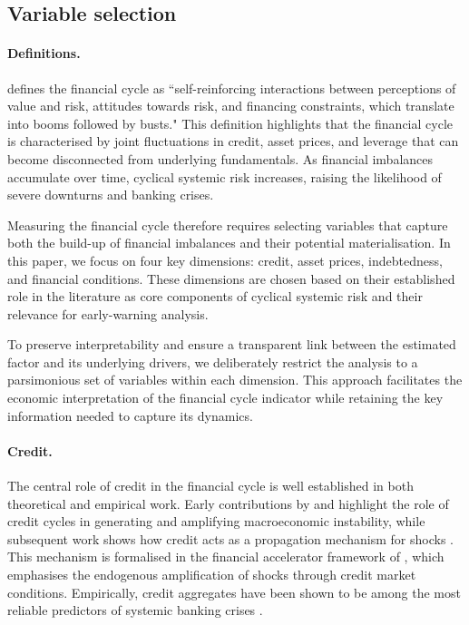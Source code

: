 \subsection{Variable selection}

\paragraph{Definitions.} 
\citet{borio2014financial} defines the financial cycle as ``self-reinforcing interactions between perceptions of value and risk, attitudes towards risk, and financing constraints, which translate into booms followed by busts." This definition highlights that the financial cycle is characterised by joint fluctuations in credit, asset prices, and leverage that can become disconnected from underlying fundamentals. As financial imbalances accumulate over time, cyclical systemic risk increases, raising the likelihood of severe downturns and banking crises.

Measuring the financial cycle therefore requires selecting variables that capture both the build-up of financial imbalances and their potential materialisation. In this paper, we focus on four key dimensions: credit, asset prices, indebtedness, and financial conditions. These dimensions are chosen based on their established role in the literature as core components of cyclical systemic risk and their relevance for early-warning analysis.

To preserve interpretability and ensure a transparent link between the estimated factor and its underlying drivers, we deliberately restrict the analysis to a parsimonious set of variables within each dimension. This approach facilitates the economic interpretation of the financial cycle indicator while retaining the key information needed to capture its dynamics.

\paragraph{Credit.}  

The central role of credit in the financial cycle is well established in both theoretical and empirical work. Early contributions by \citet{fisher1933debt} and \citet{minsky1977financial} highlight the role of credit cycles in generating and amplifying macroeconomic instability, while subsequent work shows how credit acts as a propagation mechanism for shocks \citep{bernanke1983non, gertler1988financial}. This mechanism is formalised in the financial accelerator framework of \citet{bernanke1999financial}, which emphasises the endogenous amplification of shocks through credit market conditions. Empirically, credit aggregates have been shown to be among the most reliable predictors of systemic banking crises \citep{schularick2012credit}.

